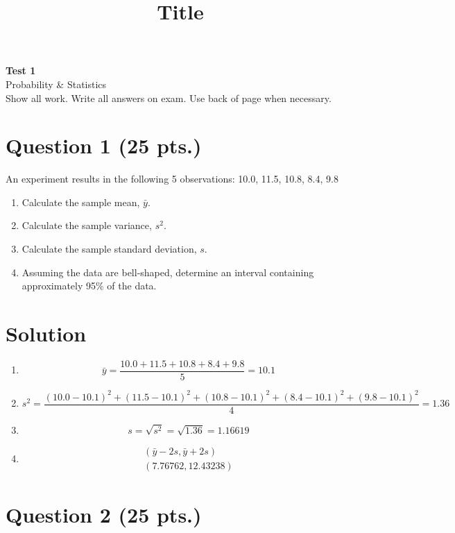\documentclass[11pt]{article}
\theoremstyle{definition}
\begin{document}
\title{Title}

\thispagestyle{empty}

\begin{center}
{\LARGE \bf Test 1} \\
{\large Probability \& Statistics} \\
{\large Show all work. Write all answers on exam. Use back of page when necessary. } \\
\end{center}
\section*{Question 1 (25 pts.)}

An experiment results in the following 5 observations: 10.0, 11.5, 10.8,  8.4,  9.8

\begin{enumerate}
	\item Calculate the sample mean, $\bar{y}$.
	\item Calculate the sample variance, $s^2$.
	\item Calculate the sample standard deviation, $s$.
	\item Assuming the data are bell-shaped, determine an interval containing approximately 95\% of the data.
\end{enumerate}

\section*{Solution}

\begin{enumerate}
	\item
		$$
			\bar{y} = \frac{10.0 + 11.5 + 10.8 +  8.4 +  9.8}{5} = 10.1
		$$
	\item
		$$
			s^2 = \frac{(10.0-10.1)^2 + (11.5-10.1)^2  + (10.8-10.1)^2  + (8.4-10.1)^2  + (9.8-10.1)^2 }{4} = 1.36
		$$
	\item
		$$
			s = \sqrt{s^2} = \sqrt{1.36} = 1.16619
		$$
	\item
		$$
			\begin{aligned}
				\left( \bar{y} - 2s, \bar{y} + 2s \right) \\
				\left( 7.76762, 12.43238 \right)
			\end{aligned}
		$$
\end{enumerate}

\newpage

\section*{Question 2 (25 pts.)}
\end{document}
